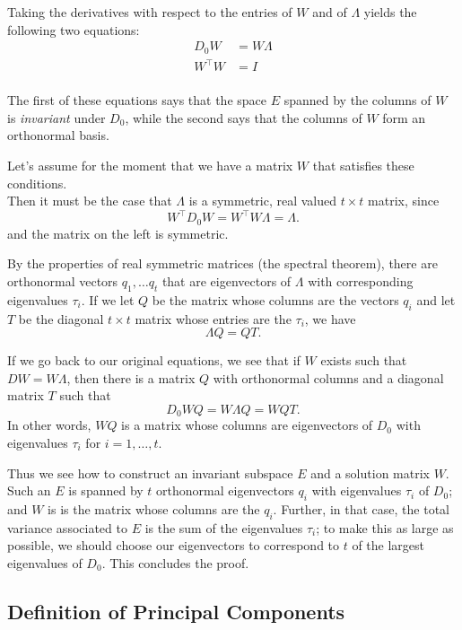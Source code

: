 \documentclass[
  oneside]{scrbook}
\begin{document}
Taking the derivatives with respect to the entries of \(W\) and of
\(\Lambda\) yields the following two equations: \begin{align*}
D_{0}W &= W\Lambda \\
W^{\intercal}W &= I \\
\end{align*}

The first of these equations says that the space \(E\) spanned by the
columns of \(W\) is \emph{invariant} under \(D_{0}\), while the second
says that the columns of \(W\) form an orthonormal basis.

Let's assume for the moment that we have a matrix \(W\) that satisfies
these conditions.\\
Then it must be the case that \(\Lambda\) is a symmetric, real valued
\(t\times t\) matrix, since \[
W^{\intercal}D_{0}W = W^{\intercal}W\Lambda = \Lambda.
\] and the matrix on the left is symmetric.

By the properties of real symmetric matrices (the spectral theorem),
there are orthonormal vectors \(q_{1},\ldots q_{t}\) that are
eigenvectors of \(\Lambda\) with corresponding eigenvalues \(\tau_{i}\).
If we let \(Q\) be the matrix whose columns are the vectors \(q_{i}\)
and let \(T\) be the diagonal \(t\times t\) matrix whose entries are the
\(\tau_{i}\), we have \[
\Lambda Q = QT.
\]

If we go back to our original equations, we see that if \(W\) exists
such that \(DW=W\Lambda\), then there is a matrix \(Q\) with orthonormal
columns and a diagonal matrix \(T\) such that \[
D_{0}WQ = W\Lambda Q = W Q T.
\] In other words, \(WQ\) is a matrix whose columns are eigenvectors of
\(D_{0}\) with eigenvalues \(\tau_{i}\) for \(i=1,\ldots, t\).

Thus we see how to construct an invariant subspace \(E\) and a solution
matrix \(W\). Such an \(E\) is spanned by \(t\) orthonormal eigenvectors
\(q_{i}\) with eigenvalues \(\tau_{i}\) of \(D_{0}\); and \(W\) is is
the matrix whose columns are the \(q_{i}\). Further, in that case, the
total variance associated to \(E\) is the sum of the eigenvalues
\(\tau_{i}\); to make this as large as possible, we should choose our
eigenvectors to correspond to \(t\) of the largest eigenvalues of
\(D_{0}\). This concludes the proof.

\hypertarget{definition-of-principal-components}{%
\subsection{Definition of Principal
Components}\label{definition-of-principal-components}}
\end{document}
